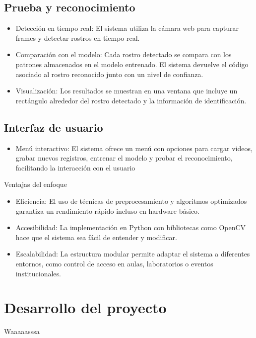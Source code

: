 \documentclass[12pt]{article}
\begin{document}
{\begin{itemize}
\end{itemize}

\subsection{Prueba y reconocimiento}
\begin{itemize}
	\item Detección en tiempo real: El sistema utiliza la cámara web para capturar frames y detectar rostros en tiempo real.
	\item Comparación con el modelo: Cada rostro detectado se compara con los patrones almacenados en el modelo entrenado. El sistema devuelve el código asociado al rostro reconocido junto con un nivel de confianza.
	\item Visualización: Los resultados se muestran en una ventana que incluye un rectángulo alrededor del rostro detectado y la información de identificación.
\end{itemize}

\subsection{Interfaz de usuario}
\begin{itemize}
	\item Menú interactivo: El sistema ofrece un menú con opciones para cargar videos, grabar nuevos registros, entrenar el modelo y probar el reconocimiento, facilitando la interacción con el usuario
\end{itemize}

{\large Ventajas del enfoque\par}
\begin{itemize}
	\item Eficiencia: El uso de técnicas de preprocesamiento y algoritmos optimizados garantiza un rendimiento rápido incluso en hardware básico.
	\item Accesibilidad: La implementación en Python con bibliotecas como OpenCV hace que el sistema sea fácil de entender y modificar.
	\item Escalabilidad: La estructura modular permite adaptar el sistema a diferentes entornos, como control de acceso en aulas, laboratorios o eventos institucionales.
\end{itemize}


\section{Desarrollo del proyecto}
Waaaaasssa


}
\end{document}
